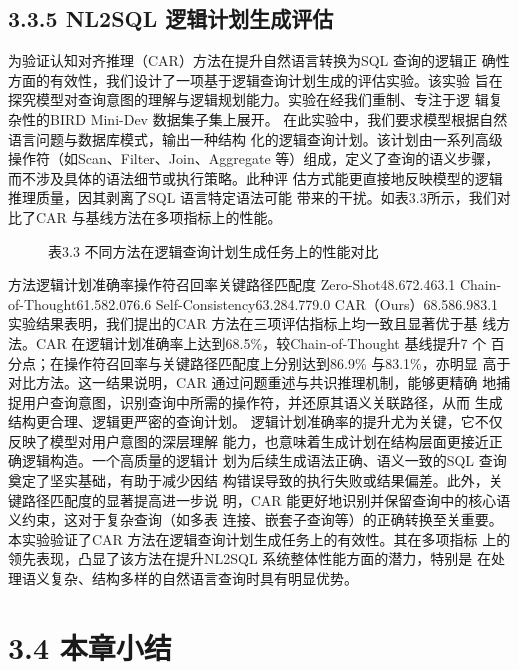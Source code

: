\documentclass[12pt,a4paper,openright,UTF8]{ctexbook}
\begin{document}
\subsection{3.3.5 NL2SQL 逻辑计划生成评估}

为验证认知对齐推理（CAR）方法在提升自然语言转换为SQL 查询的逻辑正 确性方面的有效性，我们设计了一项基于逻辑查询计划生成的评估实验。该实验 旨在探究模型对查询意图的理解与逻辑规划能力。实验在经我们重制、专注于逻 辑复杂性的BIRD Mini-Dev 数据集子集上展开。 在此实验中，我们要求模型根据自然语言问题与数据库模式，输出一种结构 化的逻辑查询计划。该计划由一系列高级操作符（如Scan、Filter、Join、Aggregate 等）组成，定义了查询的语义步骤，而不涉及具体的语法细节或执行策略。此种评 估方式能更直接地反映模型的逻辑推理质量，因其剥离了SQL 语言特定语法可能 带来的干扰。如表3.3所示，我们对比了CAR 与基线方法在多项指标上的性能。

\begin{figure}[htbp]
\centering
{}
\caption{表3.3 不同方法在逻辑查询计划生成任务上的性能对比}
\end{figure}

方法逻辑计划准确率操作符召回率关键路径匹配度 Zero-Shot48.672.463.1 Chain-of-Thought61.582.076.6 Self-Consistency63.284.779.0 CAR（Ours）68.586.983.1 实验结果表明，我们提出的CAR 方法在三项评估指标上均一致且显著优于基 线方法。CAR 在逻辑计划准确率上达到68.5\%，较Chain-of-Thought 基线提升7 个 百分点；在操作符召回率与关键路径匹配度上分别达到86.9\% 与83.1\%，亦明显 高于对比方法。这一结果说明，CAR 通过问题重述与共识推理机制，能够更精确 地捕捉用户查询意图，识别查询中所需的操作符，并还原其语义关联路径，从而 生成结构更合理、逻辑更严密的查询计划。 逻辑计划准确率的提升尤为关键，它不仅反映了模型对用户意图的深层理解 能力，也意味着生成计划在结构层面更接近正确逻辑构造。一个高质量的逻辑计 划为后续生成语法正确、语义一致的SQL 查询奠定了坚实基础，有助于减少因结 构错误导致的执行失败或结果偏差。此外，关键路径匹配度的显著提高进一步说 明，CAR 能更好地识别并保留查询中的核心语义约束，这对于复杂查询（如多表 连接、嵌套子查询等）的正确转换至关重要。 本实验验证了CAR 方法在逻辑查询计划生成任务上的有效性。其在多项指标 上的领先表现，凸显了该方法在提升NL2SQL 系统整体性能方面的潜力，特别是 在处理语义复杂、结构多样的自然语言查询时具有明显优势。

\section{3.4 本章小结}
\end{document}
